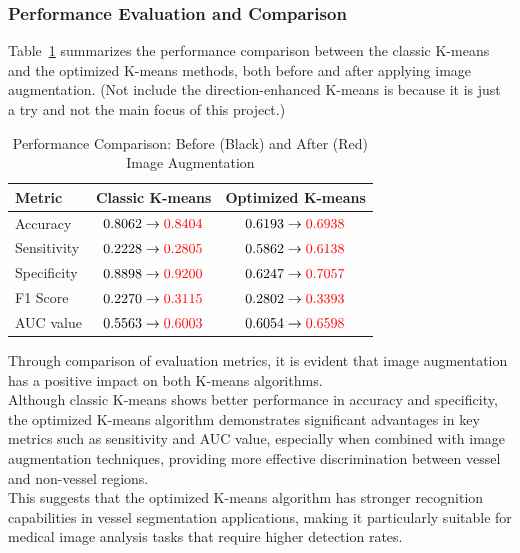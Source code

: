 \documentclass[final]{article}
\begin{document}
\subsubsection{Performance Evaluation and Comparison}
Table~\ref{tab:performance} summarizes the performance comparison between the classic K-means and the optimized K-means methods, both before and after applying image augmentation. (Not include the direction-enhanced K-means is because it is just a try and not the main focus of this project.) 
\begin{table}[H]
    \centering
    \caption{Performance Comparison: Before (Black) and After (Red) Image Augmentation}
    \label{tab:performance}
    \begin{tabular}{lcc}
    \toprule
    \textbf{Metric} & \textbf{Classic K-means} & \textbf{Optimized K-means} \\
    \midrule
    Accuracy & $0.8062 \rightarrow \textcolor{red}{0.8404}$ & $0.6193 \rightarrow \textcolor{red}{0.6938}$ \\
    Sensitivity & $0.2228 \rightarrow \textcolor{red}{0.2805}$ & $0.5862 \rightarrow \textcolor{red}{0.6138}$ \\
    Specificity & $0.8898 \rightarrow \textcolor{red}{0.9200}$ & $0.6247 \rightarrow \textcolor{red}{0.7057}$ \\
    F1 Score   & $0.2270 \rightarrow \textcolor{red}{0.3115}$ & $0.2802 \rightarrow \textcolor{red}{0.3393}$ \\
    AUC value    & $0.5563 \rightarrow \textcolor{red}{0.6003}$ & $0.6054 \rightarrow \textcolor{red}{0.6598}$ \\
    \bottomrule
    \end{tabular}
\end{table}
Through comparison of evaluation metrics, it is evident that image augmentation has a positive impact on both K-means algorithms. \\
Although classic K-means shows better performance in accuracy and specificity, the optimized K-means algorithm demonstrates significant advantages in key metrics such as sensitivity and AUC value, especially when combined with image augmentation techniques, providing more effective discrimination between vessel and non-vessel regions. \\
This suggests that the optimized K-means algorithm has stronger recognition capabilities in vessel segmentation applications, making it particularly suitable for medical image analysis tasks that require higher detection rates.
\end{document}
